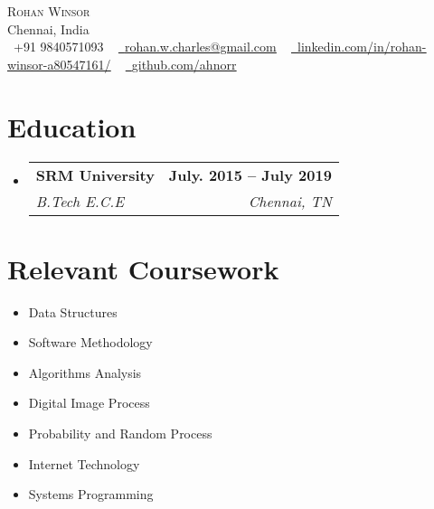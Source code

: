 \documentclass[letterpaper,11pt]{article}
\makeatletter
\newcommand{\resumeSubheading}[4]{
  \vspace{-2pt}\item
    \begin{tabular*}{1.0\textwidth}[t]{l@{\extracolsep{\fill}}r}
      \textbf{#1} & \textbf{\small #2} \\
      \textit{\small#3} & \textit{\small #4} \\
    \end{tabular*}\vspace{-7pt}
}
\newcommand{\resumeSubHeadingListStart}{\begin{itemize}[leftmargin=0.0in, label={}]}
\newcommand{\resumeSubHeadingListEnd}{\end{itemize}}
\makeatother
\begin{document}

\begin{center}
    {\Huge \scshape Rohan Winsor} \\ \vspace{1pt}
    Chennai, India \\ \vspace{1pt}
    \small \raisebox{-0.1\height}\faPhone\ +91 9840571093 ~ \href{mailto:rohan.w.charles@gmail.com}{\raisebox{-0.2\height}\faEnvelope\  \underline{rohan.w.charles@gmail.com}} ~ 
    \href{https://linkedin.com/in//}{\raisebox{-0.2\height}\faLinkedin\ \underline{linkedin.com/in/rohan-winsor-a80547161/}}  ~
    \href{https://github.com/}{\raisebox{-0.2\height}\faGithub\ \underline{github.com/ahnorr}}
    \vspace{-8pt}
\end{center}


\section{Education}
  \resumeSubHeadingListStart
    \resumeSubheading
      {SRM University}{July. 2015 -- July 2019}
      {B.Tech E.C.E}{Chennai, TN}
  \resumeSubHeadingListEnd

\section{Relevant Coursework}
        \begin{multicols}{4}
            \begin{itemize}[itemsep=-5pt, parsep=3pt]
                \item\small Data Structures
                \item Software Methodology
                \item Algorithms Analysis
                \item Digital Image Process
                \item Probability and Random Process
                \item Internet Technology
                \item Systems Programming
            \end{itemize}
        \end{multicols}
        \vspace*{2.0\multicolsep}
\end{document}
